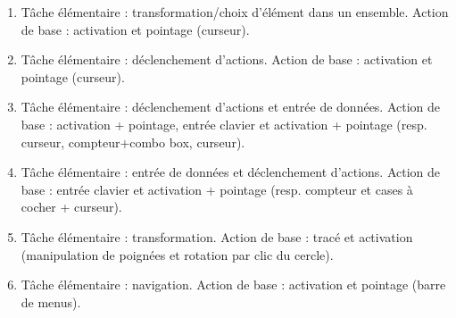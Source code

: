 \documentclass{article}
\begin{document}
\begin{enumerate}[label=\arabic*)]
    \item Tâche élémentaire : transformation/choix d'élément dans un ensemble. Action de base : activation et pointage (curseur).
    \item Tâche élémentaire : déclenchement d'actions. Action de base : activation et pointage (curseur).
    \item Tâche élémentaire : déclenchement d'actions et entrée de données. Action de base : activation + pointage, entrée clavier et activation + pointage (resp. curseur, compteur+combo box, curseur).
    \item Tâche élémentaire : entrée de données et déclenchement d'actions. Action de base : entrée clavier et activation + pointage (resp. compteur et cases à cocher + curseur).
    \item Tâche élémentaire : transformation. Action de base : tracé et activation (manipulation de poignées et rotation par clic du cercle).
    \item Tâche élémentaire : navigation. Action de base : activation et pointage (barre de menus).
\end{enumerate}
\clearpage
\end{document}
